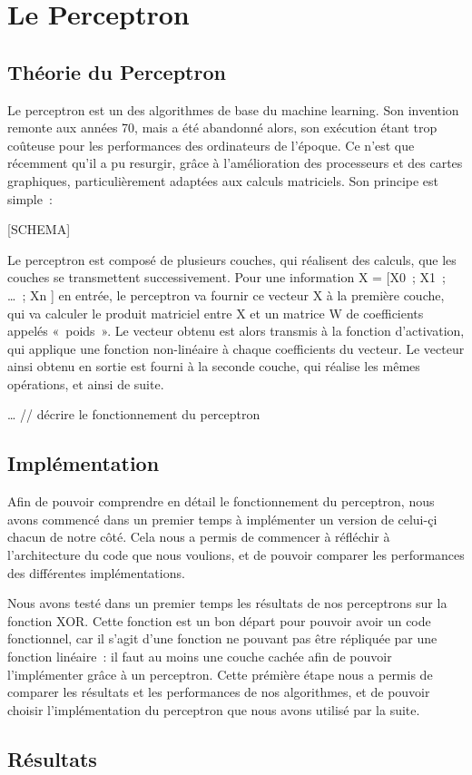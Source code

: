 \section{Le Perceptron}
\fancyhead[R]{\textit{\nouppercase{\leftmark}}}

\subsection{Théorie du Perceptron}

Le perceptron est un des algorithmes de base du machine learning. Son invention remonte aux années 70, mais a été abandonné alors, 
son exécution étant trop coûteuse pour les performances des ordinateurs de l’époque. Ce n’est que récemment qu’il a pu resurgir, grâce 
à l’amélioration des processeurs et des cartes graphiques, particulièrement adaptées aux calculs matriciels.
Son principe est simple : 

[SCHEMA]

Le perceptron est composé de plusieurs couches, qui réalisent des calculs, que les couches se transmettent successivement. Pour une 
information X  = [X0 ; X1 ; … ; Xn ] en entrée, le perceptron va fournir ce vecteur X à la première couche, qui va calculer le produit 
matriciel entre X et un matrice W de coefficients appelés « poids ». Le vecteur obtenu est alors transmis à la fonction d’activation, 
qui applique une fonction non-linéaire à chaque coefficients du vecteur. Le vecteur ainsi obtenu en sortie est fourni à la seconde couche, 
qui réalise les mêmes opérations, et ainsi de suite. 

… // décrire le fonctionnement du perceptron


\subsection{Implémentation}

Afin de pouvoir comprendre en détail le fonctionnement du perceptron, nous avons commencé dans un premier temps à implémenter un version 
de celui-çi chacun de notre côté. Cela nous a permis de commencer  à réfléchir à l’architecture du code que nous voulions, et de pouvoir 
comparer les performances des différentes implémentations. 

Nous avons testé dans un premier temps les résultats de nos perceptrons sur la fonction XOR. Cette fonction est un bon départ pour pouvoir 
avoir un code fonctionnel, car il s’agit d’une fonction ne pouvant pas être répliquée par une fonction linéaire : il faut au moins une couche 
cachée afin de pouvoir l’implémenter grâce à un perceptron. 
Cette prémière étape nous a permis de comparer les résultats et les performances de nos algorithmes, et de pouvoir choisir l’implémentation 
du perceptron que nous avons utilisé par la suite.


\subsection{Résultats}



